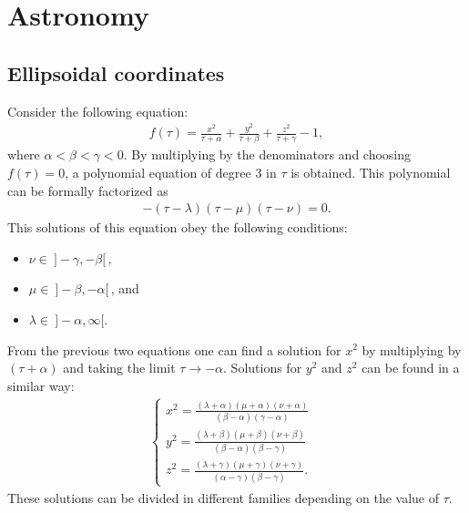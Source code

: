 \chapter{Astronomy}

\section{Ellipsoidal coordinates}

    Consider the following equation:
    \begin{gather}
        \label{astronomy:ellipsoidal_defining_function}
        f(\tau) = \frac{x^2}{\tau + \alpha} + \frac{y^2}{\tau + \beta} + \frac{z^2}{\tau + \gamma} - 1,
    \end{gather}
    where $\alpha<\beta<\gamma<0$. By multiplying by the denominators and choosing $f(\tau) = 0$, a polynomial equation of degree 3 in $\tau$ is obtained. This polynomial can be formally factorized as
    \begin{gather}
        -(\tau-\lambda)(\tau-\mu)(\tau-\nu) = 0.
    \end{gather}
    This solutions of this equation obey the following conditions:
    \begin{itemize}
        \item $\nu\in\ ]-\gamma,-\beta[$\,,
        \item $\mu\in\ ]-\beta,-\alpha[$\,, and
        \item $\lambda\in\ ]-\alpha,\infty[$.
    \end{itemize}
    From the previous two equations one can find a solution for $x^2$ by multiplying by $(\tau+\alpha)$ and taking the limit $\tau\rightarrow-\alpha$. Solutions for $y^2$ and $z^2$ can be found in a similar way:
    \begin{gather}
        \label{astronomy:ellipsoidal_coordinates}
        \begin{cases}
            x^2 = \frac{(\lambda + \alpha)(\mu + \alpha)(\nu + \alpha)}{(\beta - \alpha)(\gamma - \alpha)}&\\
            y^2 = \frac{(\lambda + \beta)(\mu + \beta)(\nu + \beta)}{(\beta - \alpha)(\beta - \gamma)}&\\
            z^2 = \frac{(\lambda + \gamma)(\mu + \gamma)(\nu + \gamma)}{(\alpha - \gamma)(\beta - \gamma)}.&
        \end{cases}
    \end{gather}
    These solutions can be divided in different families depending on the value of $\tau$.

